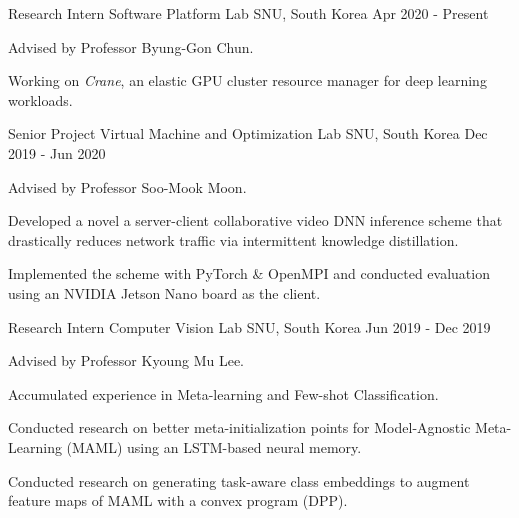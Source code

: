 

\begin{cventries}

  \cventry
    {Research Intern} %
    {Software Platform Lab} %
    {SNU, South Korea} %
    {Apr 2020 - Present} %
    {
      \begin{cvitems} %
        \item {Advised by Professor Byung-Gon Chun.}
        \item {Working on \textit{Crane}, an elastic GPU cluster resource manager for deep learning workloads.}
      \end{cvitems}
    }
    
  \cventry
    {Senior Project} %
    {Virtual Machine and Optimization Lab} %
    {SNU, South Korea} %
    {Dec 2019 - Jun 2020} %
    {
      \begin{cvitems} %
        \item {Advised by Professor Soo-Mook Moon.}
        \item {Developed a novel a server-client collaborative video DNN inference scheme that drastically reduces network traffic via intermittent knowledge distillation.}
        \item {Implemented the scheme with PyTorch \& OpenMPI and conducted evaluation using an NVIDIA Jetson Nano board as the client.}
      \end{cvitems}
    }
    
  \cventry
    {Research Intern} %
    {Computer Vision Lab} %
    {SNU, South Korea} %
    {Jun 2019 - Dec 2019} %
    {
      \begin{cvitems} %
        \item {Advised by Professor Kyoung Mu Lee.}
        \item {Accumulated experience in Meta-learning and Few-shot Classification.}
        \item {Conducted research on better meta-initialization points for Model-Agnostic Meta-Learning (MAML) using an LSTM-based neural memory.}
        \item {Conducted research on generating task-aware class embeddings to augment feature maps of MAML with a convex program (DPP).}
      \end{cvitems}
    }
    

\end{cventries}
